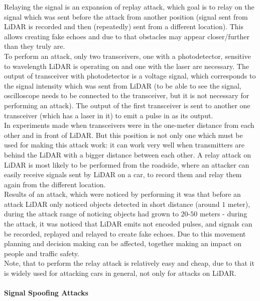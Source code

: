 Relaying the signal is an expansion of replay attack, which goal is to relay on the signal which was sent before the attack from another position (signal sent from \gls{LiDAR} is recorded and then (repeatedly) sent from a different location). This allows creating fake echoes and due to that obstacles may appear closer/further than they truly are. \\
To perform an attack, only two transceivers, one with a photodetector, sensitive to wavelength \gls{LiDAR} is operating on and one with the laser are necessary. The output of transceiver with photodetector is a voltage signal, which corresponds to the signal intensity which was sent from \gls{LiDAR} (to be able to see the signal, oscilloscope needs to be connected to the transceiver, but it is not necessary for performing an attack). The output of the first transceiver is sent to another one transceiver (which has a laser in it) to emit a pulse in as its output. \\
In \cite{AttacksOnSensors} experiments made when transceivers were in the one-meter distance from each other and in front of \gls{LiDAR}. But this position is not only one which must be used for making this attack work: it can work very well when transmitters are behind the \gls{LiDAR} with a bigger distance between each other. A relay attack on \gls{LiDAR} is most likely to be performed from the roadside, where an attacker can easily receive signals sent by \gls{LiDAR} on a car, to record them and relay them again from the different location. \\
Results of an attack, which were noticed by performing it was that before an attack \gls{LiDAR} only noticed objects detected in short distance (around $1$ meter), during the attack range of noticing objects had grown to $20$-$50$ meters - during the attack, it was noticed that \gls{LiDAR} emits not encoded pulses, and signals can be recorded, replayed and relayed to create fake echoes. Due to this movement planning and decision making can be affected, together making an impact on people and traffic safety.\\
Note, that to perform the relay attack is relatively easy and cheap, due to that it is widely used for attacking cars in general, not only for attacks on \gls{LiDAR}.

\paragraph{Signal Spoofing Attacks}

